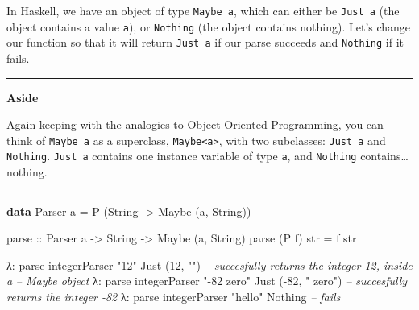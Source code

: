 \documentclass[]{article}
\newenvironment{Shaded}{}{}
\newcommand{\KeywordTok}[1]{\textcolor[rgb]{0.00,0.44,0.13}{\textbf{{#1}}}}
\newcommand{\DataTypeTok}[1]{\textcolor[rgb]{0.56,0.13,0.00}{{#1}}}
\newcommand{\DecValTok}[1]{\textcolor[rgb]{0.25,0.63,0.44}{{#1}}}
\newcommand{\StringTok}[1]{\textcolor[rgb]{0.25,0.44,0.63}{{#1}}}
\newcommand{\CommentTok}[1]{\textcolor[rgb]{0.38,0.63,0.69}{\textit{{#1}}}}
\newcommand{\OtherTok}[1]{\textcolor[rgb]{0.00,0.44,0.13}{{#1}}}
\newcommand{\FunctionTok}[1]{\textcolor[rgb]{0.02,0.16,0.49}{{#1}}}
\newcommand{\NormalTok}[1]{{#1}}
\begin{document}
In Haskell, we have an object of type \texttt{Maybe\ a}, which can either be
\texttt{Just\ a} (the object contains a value \texttt{a}), or \texttt{Nothing}
(the object contains nothing). Let's change our function so that it will return
\texttt{Just\ a} if our parse succeeds and \texttt{Nothing} if it fails.

\begin{center}\rule{0.5\linewidth}{\linethickness}\end{center}

\textbf{Aside}

Again keeping with the analogies to Object-Oriented Programming, you can think
of \texttt{Maybe\ a} as a superclass, \texttt{Maybe\textless{}a\textgreater{}},
with two subclasses: \texttt{Just\ a} and \texttt{Nothing}. \texttt{Just\ a}
contains one instance variable of type \texttt{a}, and \texttt{Nothing}
contains\ldots{}nothing.

\begin{center}\rule{0.5\linewidth}{\linethickness}\end{center}

\begin{Shaded}
\begin{Highlighting}[]
\KeywordTok{data} \DataTypeTok{Parser} \NormalTok{a }\FunctionTok{=} \DataTypeTok{P} \NormalTok{(}\DataTypeTok{String} \OtherTok{->} \DataTypeTok{Maybe} \NormalTok{(a, }\DataTypeTok{String}\NormalTok{))}

\OtherTok{parse ::} \DataTypeTok{Parser} \NormalTok{a }\OtherTok{->} \DataTypeTok{String} \OtherTok{->} \DataTypeTok{Maybe} \NormalTok{(a, }\DataTypeTok{String}\NormalTok{)}
\NormalTok{parse (}\DataTypeTok{P} \NormalTok{f) str }\FunctionTok{=} \NormalTok{f str}
\end{Highlighting}
\end{Shaded}

\begin{Shaded}
\begin{Highlighting}[]
\NormalTok{λ}\FunctionTok{:} \NormalTok{parse integerParser }\StringTok{"12"}
\DataTypeTok{Just} \NormalTok{(}\DecValTok{12}\NormalTok{, }\StringTok{""}\NormalTok{)               }\CommentTok{-- succesfully returns the integer 12, inside a}
                            \CommentTok{-- Maybe object}
\NormalTok{λ}\FunctionTok{:} \NormalTok{parse integerParser }\StringTok{"-82 zero"}
\DataTypeTok{Just} \NormalTok{(}\FunctionTok{-}\DecValTok{82}\NormalTok{, }\StringTok{" zero"}\NormalTok{)         }\CommentTok{-- succesfully returns the integer -82}
\NormalTok{λ}\FunctionTok{:} \NormalTok{parse integerParser }\StringTok{"hello"}
\DataTypeTok{Nothing}                     \CommentTok{-- fails}
\end{Highlighting}
\end{Shaded}
\end{document}
